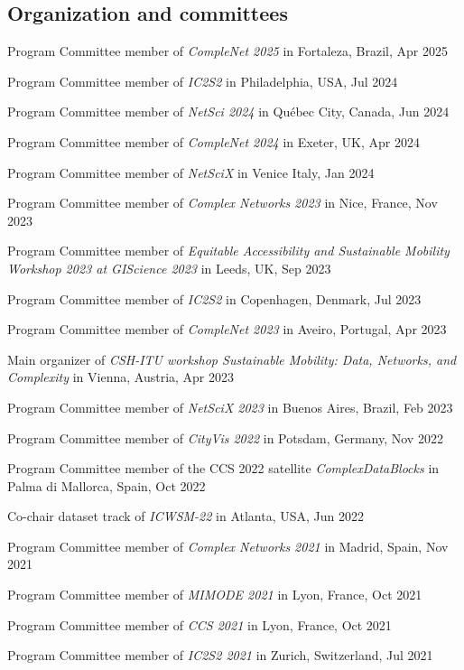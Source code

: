 \documentclass[10pt,a4paper]{article}
\renewenvironment{itemize}{
  \begin{list}{}{
    \setlength{\leftmargin}{1.5em}
    \setlength{\itemsep}{0.25em}
    \setlength{\parskip}{0pt}
    \setlength{\parsep}{0.25em}
  }
}{
  \end{list}
}
\begin{document}
\subsection*{Organization and committees}
\begin{itemize}
\item{Program Committee member of \emph{CompleNet 2025} in Fortaleza, Brazil, Apr 2025}
\item{Program Committee member of \emph{IC2S2} in Philadelphia, USA, Jul 2024}
\item{Program Committee member of \emph{NetSci 2024} in Québec City, Canada, Jun 2024}
\item{Program Committee member of \emph{CompleNet 2024} in Exeter, UK, Apr 2024}
\item{Program Committee member of \emph{NetSciX} in Venice Italy, Jan 2024}
\item{Program Committee member of \emph{Complex Networks 2023} in Nice, France, Nov 2023}
\item{Program Committee member of \emph{Equitable Accessibility and Sustainable Mobility Workshop 2023 at GIScience 2023} in Leeds, UK, Sep 2023}
\item{Program Committee member of \emph{IC2S2} in Copenhagen, Denmark, Jul 2023}
\item{Program Committee member of \emph{CompleNet 2023} in Aveiro, Portugal, Apr 2023}
\item{Main organizer of \emph{CSH-ITU workshop Sustainable Mobility: Data, Networks, and Complexity} in Vienna, Austria, Apr 2023}
\item{Program Committee member of \emph{NetSciX 2023} in Buenos Aires, Brazil, Feb 2023}
\item{Program Committee member of \emph{CityVis 2022} in Potsdam, Germany, Nov 2022}
\item{Program Committee member of the CCS 2022 satellite \emph{ComplexDataBlocks} in Palma di Mallorca, Spain, Oct 2022}
\item{Co-chair dataset track of \emph{ICWSM-22} in Atlanta, USA, Jun 2022}
\item{Program Committee member of \emph{Complex Networks 2021} in Madrid, Spain, Nov 2021}
\item{Program Committee member of \emph{MIMODE 2021} in Lyon, France, Oct 2021}
\item{Program Committee member of \emph{CCS 2021} in Lyon, France, Oct 2021}
\item{Program Committee member of \emph{IC2S2 2021} in Zurich, Switzerland, Jul 2021}

\end{itemize}
\end{document}
